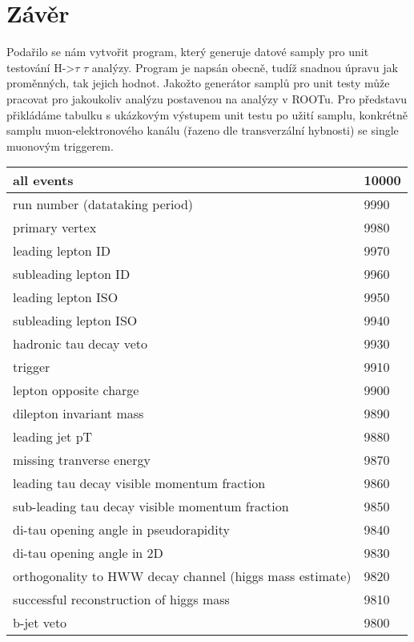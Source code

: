 \documentclass{article}
\begin{document}
\section*{Závěr}
\par Podařilo se nám vytvořit program, který generuje datové samply pro unit testování H->$\tau$ $\tau$ analýzy. Program je napsán obecně, tudíž snadnou úpravu jak proměnných, tak jejich hodnot. Jakožto generátor samplů pro unit testy může pracovat pro jakoukoliv analýzu postavenou na analýzy v ROOTu. Pro představu přikládáme tabulku s ukázkovým výstupem unit testu po užití samplu, konkrétně samplu muon-elektronového kanálu (řazeno dle transverzální hybnosti) se single muonovým triggerem.
\begin{center}
\begin{tabular}{ | p{6cm} | p{1cm}|} 
\hline
all events & 10000 \\ 
\hline
run number (datataking period) & 9990 \\ 
\hline
primary vertex & 9980 \\ 
\hline
leading lepton ID & 9970 \\ 
\hline
subleading lepton ID & 9960 \\ 
\hline
leading lepton ISO & 9950 \\ 
\hline
subleading lepton ISO & 9940 \\ 
\hline
hadronic tau decay veto & 9930 \\ 
\hline
trigger & 9910 \\ 
\hline
lepton opposite charge & 9900 \\ 
\hline
dilepton invariant mass & 9890 \\ 
\hline
leading jet pT & 9880 \\ 
\hline
missing tranverse energy & 9870 \\ 
\hline
leading tau decay visible momentum fraction & 9860 \\ 
\hline
sub-leading tau decay visible momentum fraction & 9850 \\ 
\hline
di-tau opening angle in pseudorapidity & 9840 \\ 
\hline
di-tau opening angle in 2D & 9830 \\ 
\hline
orthogonality to HWW decay channel (higgs mass estimate) & 9820 \\ 
\hline
successful reconstruction of higgs mass & 9810 \\ 
\hline
b-jet veto & 9800 \\ 
\hline
\end{tabular}
\end{center}
\end{document}
